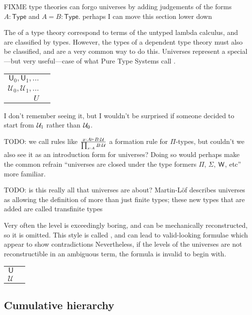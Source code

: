 \documentclass[11pt]{article} %
\theoremstyle{definition}
\theoremstyle{remark}
\begin{document}
FIXME type theories can forgo universes by adding judgements of the forms $A : \mathsf{Type}$ and $A = B : \mathsf{Type}$.
perhaps I can move this section lower down

The  of a type theory correspond to terms of the untyped lambda calculus, and are classified by types.
However, the types of a dependent type theory must also be classified, and  are a very common way to do this.
Universes represent a special---but very useful---case of what Pure Type Systems call .
\begin{center}
\renewcommand{\arraystretch}{1.2}
\begin{tabular}{rp{10cm}}
$\mathsf U_0, \mathsf U_1, \ldots$ & \\
$\mathcal U_0, \mathcal U_1, \ldots$ & \\
$U$ & \cite{martin-lof_1984} \\
\end{tabular}
\end{center}
I don't remember seeing it, but I wouldn't be surprised if someone decided to start from $\mathcal{U}_1$ rather than $\mathcal{U}_0$.

TODO: we call rules like $\frac{x:A \vdash B : \U}{\Pitype{x}{A}B : \U}$ a formation rule for $\Pi$-types, but couldn't we also see it as an introduction form for universes?
Doing so would perhaps make the common refrain ``universes are closed under the type formers $\Pi$, $\Sigma$, $\mathsf{W}$, etc'' more familiar.

TODO: is this really all that universes are about?
Martin-L\"of\cite{martin-lof_1984} describes universes as allowing the definition of more than just finite types; these new types that are added are called transfinite types

Very often the level is exceedingly boring, and can be mechanically reconstructed, so it is omitted.
This style is called , and can lead to valid-looking formulae which appear to show contradictions
Nevertheless, if the levels of the universes are not reconstructible in an ambiguous term, the formula is invalid to begin with.
\begin{center}
\renewcommand{\arraystretch}{1.2}
\begin{tabular}{rp{10cm}}
$\mathsf U$ & \\
$\mathcal U$ & \\
\end{tabular}
\end{center}

\subsection{Cumulative hierarchy}
\end{document}
